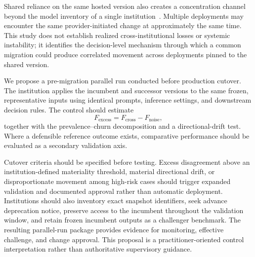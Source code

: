\documentclass{ieeeaccess}
\begin{document}
Shared reliance on the same hosted version also creates a concentration channel beyond the model inventory of a single institution~\cite{esrb}. Multiple deployments may encounter the same provider-initiated change at approximately the same time. This study does not establish realized cross-institutional losses or systemic instability; it identifies the decision-level mechanism through which a common migration could produce correlated movement across deployments pinned to the shared version.

We propose a pre-migration parallel run conducted before production cutover. The institution applies the incumbent and successor versions to the same frozen, representative inputs using identical prompts, inference settings, and downstream decision rules. The control should estimate
\begin{equation}
F_{\mathrm{excess}} = F_{\mathrm{cross}} - F_{\mathrm{noise}},
\end{equation}
together with the prevalence--churn decomposition and a directional-drift test. Where a defensible reference outcome exists, comparative performance should be evaluated as a secondary validation axis.

Cutover criteria should be specified before testing. Excess disagreement above an institution-defined materiality threshold, material directional drift, or disproportionate movement among high-risk cases should trigger expanded validation and documented approval rather than automatic deployment. Institutions should also inventory exact snapshot identifiers, seek advance deprecation notice, preserve access to the incumbent throughout the validation window, and retain frozen incumbent outputs as a challenger benchmark. The resulting parallel-run package provides evidence for monitoring, effective challenge, and change approval. This proposal is a practitioner-oriented control interpretation rather than authoritative supervisory guidance.
\end{document}
